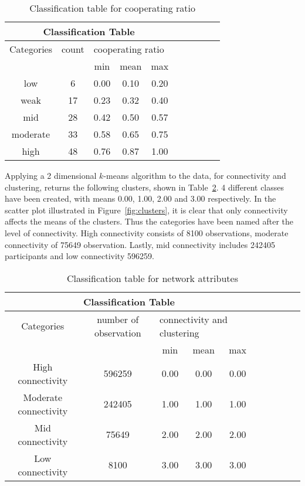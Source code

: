 \begin{table}[H]
	\centering
	\begin{adjustbox}{width=0.4\textwidth}
		\small
		\begin{tabular}{cccccccccc}
				\toprule
			\multicolumn{5}{|c|}{Classification Table}                        \\ \hline
			Categories & count & \multicolumn{3}{l}{cooperating ratio}        \\ \hline
			         &    & min  & mean & max  \\ \hline
			low      & 6  & 0.00 & 0.10 & 0.20 \\ \hline
			weak     & 17 & 0.23 & 0.32 & 0.40 \\ \hline
			mid      & 28 & 0.42 & 0.50 & 0.57 \\ \hline
			moderate & 33 & 0.58 & 0.65 & 0.75 \\ \hline
			high     & 48 & 0.76 & 0.87 & 1.00 \\ \bottomrule
		\end{tabular}
	\end{adjustbox}
	\caption{Classification table for cooperating ratio}
	\label{table:class}
\end{table}

Applying a 2 dimensional \(k\)-means algorithm to the data, for connectivity and
clustering, returns the following clusters, shown in Table~\ref{table:clusters}.
4 different classes have been created, with means 0.00, 1.00, 2.00 and 3.00 respectively.
In the scatter plot illustrated in Figure~\ref{fig:clusters}, it is clear that only connectivity
affects the means of the clusters. Thus the categories have been named after
the level of connectivity. High connectivity consists of 8100 observations,
moderate connectivity of 75649 observation. Lastly, mid connectivity includes
242405 participants and low connectivity 596259.

\begin{table}[!hbtp]
	\centering
	\begin{adjustbox}{width=0.7\textwidth}
		\small
		\begin{tabular}{cccccccccc}
				\toprule
			\multicolumn{5}{|c|}{Classification Table} \\ \hline
			Categories & number of observation & \multicolumn{3}{l}{connectivity and clustering} \\ \hline
			                      &        & min  & mean & max  \\ \hline
			High connectivity     & 596259 & 0.00 & 0.00 & 0.00 \\ \hline
			Moderate connectivity & 242405 & 1.00 & 1.00 & 1.00 \\ \hline
			Mid connectivity      & 75649  & 2.00 & 2.00 & 2.00 \\ \hline
			Low connectivity      & 8100   & 3.00 & 3.00 & 3.00 \\ \bottomrule
		\end{tabular}
	\end{adjustbox}
	\caption{Classification table for network attributes}
	\label{table:clusters}
\end{table}

